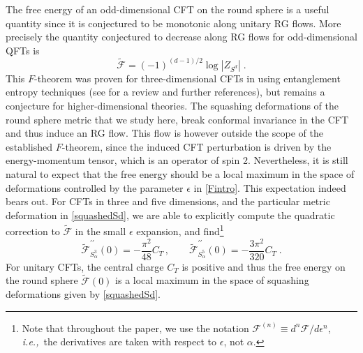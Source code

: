 \documentclass[12pt]{article}
\numberwithin{equation}{section}
\newcommand{\ssc}{\scriptscriptstyle}
\newcommand{\ie}{{\it i.e.,}\ }
\newcommand{\ctt}{C_{\ssc T}}
\begin{document}
The free energy of an odd-dimensional CFT on the round sphere is a useful quantity since it is conjectured to be monotonic along unitary RG flows. More precisely the quantity conjectured to decrease along RG flows for odd-dimensional QFTs is \cite{Klebanov:2011gs} 
%
\begin{equation}\label{Ftildedef}
\tilde{\mathcal{F}} = (-1)^{(d-1)/2}\log |Z_{S^d}|\;.
\end{equation}
%
This $F$-theorem was proven for three-dimensional CFTs in \cite{Casini:2012ei} using entanglement entropy techniques (see \cite{Pufu:2016zxm} for a review and further references), but remains a conjecture for higher-dimensional theories. The squashing deformations of the round sphere metric that we study here, break conformal invariance in the CFT and thus induce an RG flow. This flow is however outside the scope of the established $F$-theorem, since the induced CFT perturbation is driven by the energy-momentum tensor, which is an operator of spin 2. Nevertheless, it is still natural to expect that the free energy should be a local maximum in the space of deformations controlled by the parameter $\epsilon$ in \eqref{Fintro}. This expectation indeed bears out. For CFTs in three and five dimensions, and the particular metric deformation in \eqref{squashedSd},  we are able to explicitly compute the quadratic correction to $\tilde{\mathcal{F}}$ in the small $\epsilon$ expansion, and find\footnote{Note that throughout the paper, we use the notation $\mathcal{F}^{(n)}\equiv d^n \mathcal{F}/d\epsilon^n$, \ie the derivatives are taken with respect to $\epsilon$, not $\alpha$.}
%
\begin{equation}\label{introFprresults}
\tilde{\mathcal{F}}^{\prime\prime}_{S^{3}_{\alpha}}(0)= - \frac{\pi^2}{48}\ctt\,, \quad \quad
\tilde{\mathcal{F}}^{\prime\prime}_{S^{5}_{\alpha}}(0)= - \frac{3\pi^2}{320}\ctt\;.
\end{equation}
%
For unitary CFTs, the central charge $\ctt$ is positive and thus the free energy on the round sphere $\tilde{\mathcal{F}}(0)$ is a local maximum in the space of squashing deformations given by \eqref{squashedSd}.
\end{document}
